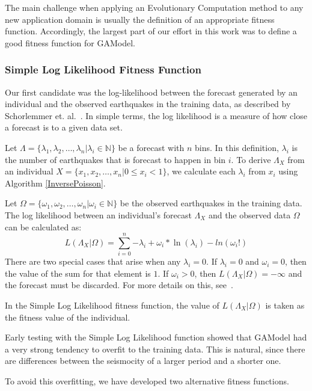\documentclass{sig-alternate}
\begin{document}
The main challenge when applying an Evolutionary Computation method to
any new application domain is usually the definition of an appropriate
fitness function. Accordingly, the largest part of our effort in this
work was to define a good fitness function for GAModel.

\subsubsection{Simple Log Likelihood Fitness Function}

Our first candidate was the log-likelihood between the forecast
generated by an individual and the observed earthquakes in the
training data, as described by Schorlemmer
et. al.~\cite{Schorlemmer2007}. In simple terms, the log likelihood is
a measure of how close a forecast is to a given data set.

Let $\Lambda = \{\lambda_1, \lambda_2, \dots, \lambda_n | \lambda_i
\in \mathbb{N}\}$ be a forecast with $n$ bins. In this definition,
$\lambda_i$ is the number of earthquakes that is forecast to happen in
bin $i$. To derive $\Lambda_X$ from an individual $X = \{x_1, x_2,
\dots, x_n | 0 \leq x_i < 1\}$, we calculate each $\lambda_i$ from
$x_i$ using Algorithm \ref{InversePoisson}.

Let $\Omega = \{\omega_1, \omega_2, \dots, \omega_n | \omega_i \in
\mathbb{N}\}$ be the observed earthquakes in the training data. The
log likelihood between an individual's forecast $\Lambda_X$ and the
observed data $\Omega$ can be calculated as:
\begin{equation}
  L(\Lambda_X|\Omega) = \sum_{i=0}^n {-\lambda_i +
    \omega_i*\ln(\lambda_i)-ln(\omega_i!)}
\end{equation}
There are two special cases that arise when any $\lambda_i = 0$. If
$\lambda_i = 0$ and $\omega_i = 0$, then the value of the sum for that
element is $1$. If $\omega_i > 0$, then $L(\Lambda_X|\Omega) =
-\infty$ and the forecast must be discarded. For more details on
this, see~\cite{Schorlemmer}.

In the Simple Log Likelihood fitness function, the value of
$L(\Lambda_X|\Omega)$ is taken as the fitness value of the individual.

Early testing with the Simple Log Likelihood function showed that
GAModel had a very strong tendency to overfit to the training
data. This is natural, since there are differences between the
seismocity of a larger period and a shorter one. 

To avoid this overfitting, we have developed two alternative fitness
functions.
\end{document}
